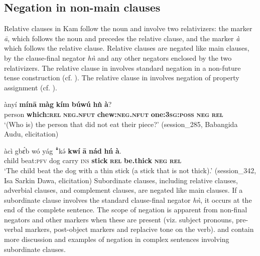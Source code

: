 \documentclass[output=paper,colorlinks,citecolor=brown]{langscibook}
\begin{document}
\subsection{Negation in non-main clauses}\label{sec:kam:2.4}

Relative clauses in Kam follow the noun and involve two relativizers: the marker \textit{ā}, which follows the noun and precedes the relative clause, and the marker \textit{à} which follows the relative clause. Relative clauses are negated like main clauses, by the clause-final negator \textit{hǹ} and any other negators enclosed by the two relativizers. The relative clause in  involves standard negation in a non-future tense construction (cf. ). The relative clause in  involves negation of property assignment (cf. ).

\ea\label{ex:kam:52} 
    \gll ànyí \textbf{mínā} \textbf{màg} \textbf{kím} \textbf{búwú} \textbf{hǹ} \textbf{à}?\\
        person \textbf{which:\textsc{rel}} \textbf{\textsc{neg}}\textbf{.\textsc{nfut}} \textbf{chew:\textsc{neg}}\textbf{.\textsc{nfut}} \textbf{one:3\textsc{sg}}\textbf{:\textsc{poss}} \textbf{\textsc{neg}} \textbf{\textsc{rel}}\\
    \glt ‘(Who is) the person that did not eat their piece?’ (session\_285, Babangida Audu, elicitation)\\
\z 

\ea\label{ex:kam:53} 
    \gll àcì gbɛ́b wó yág ꜜkə́ \textbf{kwí} \textbf{ā} \textbf{nád} \textbf{hń} \textbf{à}.\\
        child beat:\textsc{pfv} dog carry \textsc{ins} \textbf{stick} \textbf{\textsc{rel}} \textbf{be.thick} \textbf{\textsc{neg}} \textbf{\textsc{rel}}\\
    \glt ‘The child beat the dog with a thin stick (a stick that is not thick).’ (session\_342, Isa Sarkin Dawa, elicitation)
\z 
Subordinate clauses, including relative clauses, adverbial clauses, and complement clauses, are negated like main clauses. If a subordinate clause involves the standard clause-final negator \textit{hǹ}, it occurs at the end of the complete sentence. The scope of negation is apparent from non-final negators and other markers when these are present (viz. subject pronouns, pre-verbal markers, post-object markers and replacive tone on the verb).  and  contain more discussion and examples of negation in complex sentences involving subordinate clauses.
\end{document}
